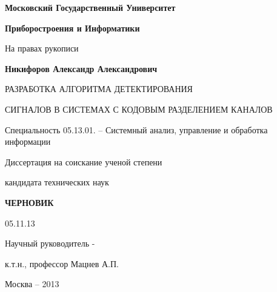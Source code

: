 \noindent\centerline{\bf{Московский Государственный Университет}}
\noindent\centerline{\bf{Приборостроения и Информатики}}
\vspace{\baselineskip}
\vspace{\baselineskip}

\hfill На правах рукописи

\vspace{\baselineskip}
\vspace{\baselineskip}

\noindent\centerline{\bf{Никифоров Александр Александрович}}

\vspace{\baselineskip}
\vspace{\baselineskip}

\noindent\centerline{РАЗРАБОТКА АЛГОРИТМА ДЕТЕКТИРОВАНИЯ}
\noindent\centerline{СИГНАЛОВ В СИСТЕМАХ С КОДОВЫМ РАЗДЕЛЕНИЕМ КАНАЛОВ}

\vspace{\baselineskip}
\vspace{\baselineskip}

\noindent\centerline{Специальность 05.13.01. – Системный анализ, управление и обработка информации}

\vspace{\baselineskip}
\vspace{\baselineskip}

\noindent\centerline{Диссертация на соискание ученой степени}
\noindent\centerline{кандидата технических наук}


\vspace{\baselineskip}
\vspace{\baselineskip}
\noindent\centerline{\bf{ЧЕРНОВИК}}
\noindent\centerline{05.11.13}

\vspace{\baselineskip}
\vspace{\baselineskip}

\hfill{Научный руководитель -}

\hfill{к.т.н., профессор Мацнев А.П.}

\vfill
\noindent\centerline{Москва – 2013}

\newpage
